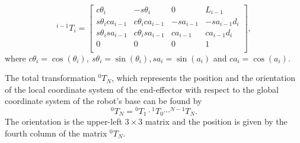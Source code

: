 \begin{equation}
^{i-1}T_i = 
\begin{bmatrix}
c\theta_i & -s\theta_i & 0 & L_{i-1} \\
s\theta_ica_{i-1} & c\theta_ica_{i-1} & -sa_{i-1} & -sa_{i-1}d_i \\
s\theta_isa_{i-1} & c\theta_isa_{i-1} & ca_{i-1} & ca_{i-1}d_i \\
0 & 0 & 0 & 1\\
\end{bmatrix},
\end{equation}
where $c\theta_i = \cos(\theta_i),~s\theta_i=\sin(\theta_i), sa_i=\sin(a_i)$ and $ca_i=\cos(a_i)$.

The total transformation $^{0}T_N$, which represents the position and the 
orientation of the local coordinate system of the end-effector with respect to the global coordinate system of the robot's base can be found by 
\begin{equation}
^{0}T_N = {}^{0}T_1 \cdot {}^{1}T_0 \cdots {}^{N-1}T_N.
\end{equation}
The orientation is the upper-left $3\times3$ matrix and the position is given by the fourth column of the matrix $^{0}T_N$.

